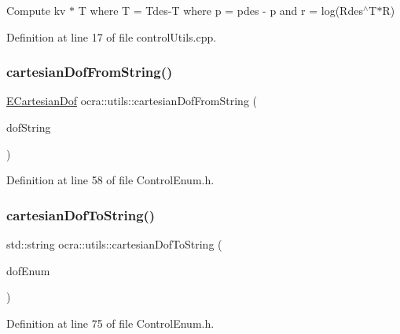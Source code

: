 Compute kv $\ast$  T where  T = Tdes-\/T where  p = pdes -\/ p and  r = log(\+Rdes$^\wedge$\+T$\ast$\+R) 

Definition at line 17 of file control\+Utils.\+cpp.

\hypertarget{namespaceocra_1_1utils_acfe425f7bacb0a3c69e868e7f368d99c}{}\label{namespaceocra_1_1utils_acfe425f7bacb0a3c69e868e7f368d99c} 
\subsubsection{\texorpdfstring{cartesian\+Dof\+From\+String()}{cartesianDofFromString()}}
{\footnotesize\ttfamily \hyperlink{namespaceocra_a436781c7059a0f76027df1c652126260}{E\+Cartesian\+Dof} ocra\+::utils\+::cartesian\+Dof\+From\+String (\begin{DoxyParamCaption}\item[{const std\+::string \&}]{dof\+String }\end{DoxyParamCaption})\hspace{0.3cm}{\ttfamily [inline]}}



Definition at line 58 of file Control\+Enum.\+h.

\hypertarget{namespaceocra_1_1utils_a5e098489ff3bc369635762ab1a208b0e}{}\label{namespaceocra_1_1utils_a5e098489ff3bc369635762ab1a208b0e} 
\subsubsection{\texorpdfstring{cartesian\+Dof\+To\+String()}{cartesianDofToString()}}
{\footnotesize\ttfamily std\+::string ocra\+::utils\+::cartesian\+Dof\+To\+String (\begin{DoxyParamCaption}\item[{const \hyperlink{namespaceocra_a436781c7059a0f76027df1c652126260}{E\+Cartesian\+Dof}}]{dof\+Enum }\end{DoxyParamCaption})\hspace{0.3cm}{\ttfamily [inline]}}



Definition at line 75 of file Control\+Enum.\+h.

